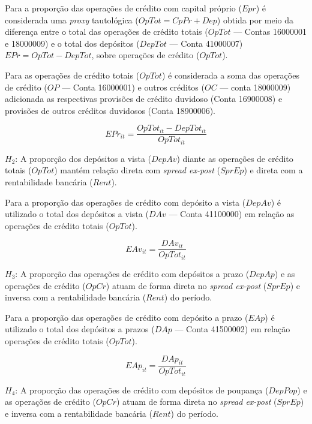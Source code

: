 \documentclass[
  12pt,
  12pt,
  openright,
  oneside,
  a4paper,
  chapter=TITLE,
  section=TITLE,
  subsection=TITLE,
  subsubsection=TITLE,
  portugues,
  sumario=tradicional]{abntex2}
\begin{document}
Para a proporção das operações de crédito com capital próprio (\(Epr\)) é considerada uma \emph{proxy} tautológica (\(OpTot = CpPr + Dep\)) obtida por meio da diferença entre o total das operações de crédito totais (\(OpTot\) --- Contas 16000001 e 18000009) e o total dos depósitos (\(DepTot\) --- Conta 41000007) \(EPr = OpTot - DepTot\), sobre operações de crédito (\(OpTot\)).

Para as operações de crédito totais (\(OpTot\)) é considerada a soma das operações de crédito (\(OP\) --- Conta 16000001) e outros créditos (\(OC\) --- conta 18000009) adicionada as respectivas provisões de crédito duvidoso (Conta 16900008) e provisões de outros créditos duvidosos (Conta 18900006).

\begin{equation}
EPr_{it} = \frac{OpTot_{it} - DepTot_{it}}{OpTot_{it}}
\end{equation}

\(H_{2}\): A proporção dos depósitos a vista (\(DepAv\)) diante as operações de crédito totais (\(OpTot\)) mantém relação direta com \emph{spread ex-post} (\(SprEp\)) e direta com a rentabilidade bancária (\(Rent\)).

Para a proporção das operações de crédito com depósito a vista (\(DepAv\)) é utilizado o total dos depósitos a vista (\(DAv\) --- Conta 41100000) em relação as operações de crédito totais (\(OpTot\)).

\begin{equation}
EAv_{it} = \frac{DAv_{it}}{OpTot_{it}}
\end{equation}

\(H_{3}\): A proporção das operações de crédito com depósitos a prazo (\(DepAp\)) e as operações de crédito (\(OpCr\)) atuam de forma direta no \emph{spread ex-post} (\(SprEp\)) e inversa com a rentabilidade bancária (\(Rent\)) do período.

Para a proporção das operações de crédito com depósito a prazo (\(EAp\)) é utilizado o total dos depósitos a prazos (\(DAp\) --- Conta 41500002) em relação operações de crédito totais (\(OpTot\)).

\begin{equation}
EAp_{it} = \frac{DAp_{it}}{OpTot_{it}}
\end{equation}

\(H_{4}\): A proporção das operações de crédito com depósitos de poupança (\(DepPop\)) e as operações de crédito (\(OpCr\)) atuam de forma direta no \emph{spread ex-post} (\(SprEp\)) e inversa com a rentabilidade bancária (\(Rent\)) do período.
\end{document}
